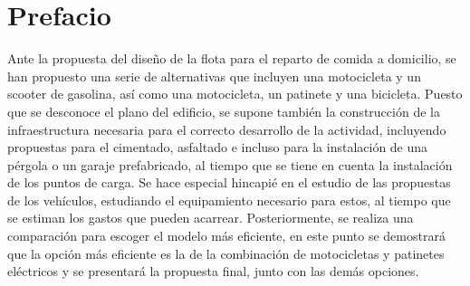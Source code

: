 \section*{\hfill Prefacio}   
Ante la propuesta del diseño de la flota para el reparto de comida a domicilio, se han propuesto una serie de alternativas que incluyen una motocicleta y un scooter de gasolina, así como una motocicleta, un patinete y una bicicleta. Puesto que se desconoce el plano del edificio, se supone también la construcción de la infraestructura necesaria para el correcto desarrollo de la actividad, incluyendo propuestas para el cimentado, asfaltado e incluso para la instalación de una pérgola o un garaje prefabricado, al tiempo que se tiene en cuenta la instalación de los puntos de carga. Se hace especial hincapié en el estudio de las propuestas de los vehículos, estudiando el equipamiento necesario para estos, al tiempo que se estiman los gastos que pueden acarrear. Posteriormente, se realiza una comparación para escoger el modelo más eficiente, en este punto se demostrará que la opción más eficiente es la de la combinación de motocicletas y patinetes eléctricos y se presentará la propuesta final, junto con las demás opciones.
